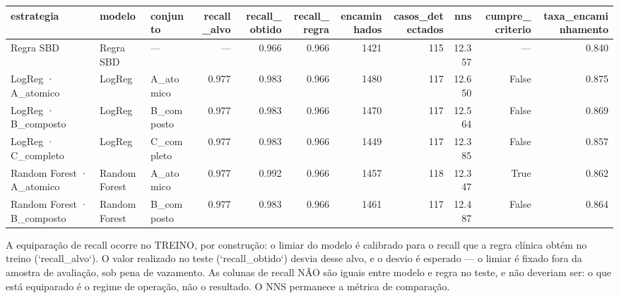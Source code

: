\begin{tabular}{lllrrrrrrrr}
\toprule
estrategia & modelo & conjunto & recall_alvo & recall_obtido & recall_regra & encaminhados & casos_detectados & nns & cumpre_criterio & taxa_encaminhamento \\
\midrule
Regra SBD & Regra SBD & — & — & 0.966 & 0.966 & 1421 & 115 & 12.357 & — & 0.840 \\
LogReg · A_atomico & LogReg & A_atomico & 0.977 & 0.983 & 0.966 & 1480 & 117 & 12.650 & False & 0.875 \\
LogReg · B_composto & LogReg & B_composto & 0.977 & 0.983 & 0.966 & 1470 & 117 & 12.564 & False & 0.869 \\
LogReg · C_completo & LogReg & C_completo & 0.977 & 0.983 & 0.966 & 1449 & 117 & 12.385 & False & 0.857 \\
Random Forest · A_atomico & Random Forest & A_atomico & 0.977 & 0.992 & 0.966 & 1457 & 118 & 12.347 & True & 0.862 \\
Random Forest · B_composto & Random Forest & B_composto & 0.977 & 0.983 & 0.966 & 1461 & 117 & 12.487 & False & 0.864 \\
\bottomrule
\end{tabular}

\begin{flushleft}
\footnotesize A equiparação de recall ocorre no TREINO, por construção: o limiar do modelo é calibrado para o recall que a regra clínica obtém no treino (`recall_alvo`). O valor realizado no teste (`recall_obtido`) desvia desse alvo, e o desvio é esperado — o limiar é fixado fora da amostra de avaliação, sob pena de vazamento. As colunas de recall NÃO são iguais entre modelo e regra no teste, e não deveriam ser: o que está equiparado é o regime de operação, não o resultado. O NNS permanece a métrica de comparação.
\end{flushleft}
